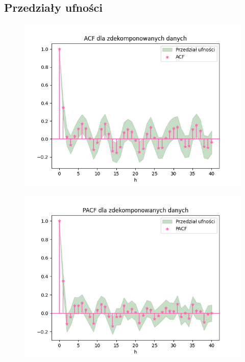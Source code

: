 \documentclass[12pt]{article}
\begin{document}
\subsection{Przedziały ufności}
\begin{figure}[!htbp]
    \centering
    \includegraphics[scale=0.70]{przedzial_acf.png}
    \label{fig:enter-label}
\end{figure}

\begin{figure}[!htbp]
    \centering
    \includegraphics[scale=0.70]{przedział_pacf.png}
    \label{fig:enter-label}
\end{figure}
\end{document}
